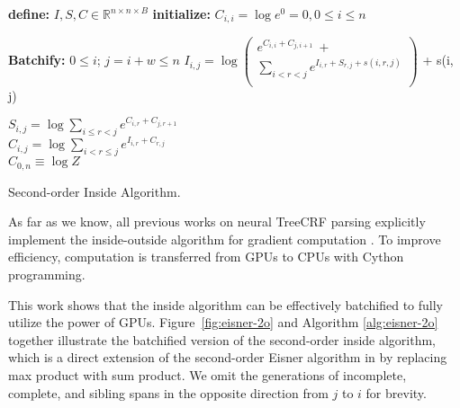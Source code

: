 \documentclass[11pt,a4paper]{article}
\begin{document}
\begin{algorithm}[tb]
\begin{algorithmic}[1]
\newlength{\commentindent}
\setlength{\commentindent}{.2\textwidth}
\renewcommand{\algorithmiccomment}[1]{\unskip\hfill\makebox[\commentindent][l]{$\rhd$~#1}\par}
\LetLtxMacro{\oldalgorithmic}{\algorithmic}
\renewcommand{\algorithmic}[1][0]{\oldalgorithmic[#1]\renewcommand{\ALC@com}[1]{\ifnum\pdfstrcmp{##1}{default}=0\else\algorithmiccomment{##1}\fi}}
\begin{footnotesize}
\STATE \textbf{define:} $I,S,C \in \mathbb{R}^{n \times n \times B}$ 
\STATE \textbf{initialize:} $C_{i, i} = \log e^0 = 0, 0 \le i \le n$


\STATE \textbf{Batchify:} $0 \le i$; $j=i+w \le n$
  \STATE
    $I_{i, j} = \log\left(
      \begin{array}{l}
        e^{C_{i, i}  +  C_{j, i+1}} ~ + \\
      \sum\limits_{i < r < j} e^{I_{i, r} + S_{r, j}
      + s(i, r, j)} \\

      \end{array}
      \right)$ + s(i, j)



  \STATE $S_{i, j} = \log \sum\limits_{i \le r < j} e^{C_{i, r}  +  C_{j, r+1}} $ \\
\STATE $C_{i, j} = \log
    \sum\limits_{i < r \le j} e^{I_{i, r}  +  C_{r, j}}  $ \\
\ENDFOR {}
\RETURN $C_{0, n} \equiv \log Z$
\end{footnotesize}
\end{algorithmic}
\caption{Second-order Inside Algorithm.}
\label{alg:eisner-2o}
\end{algorithm}




%
 
As far as we know, all previous works on neural TreeCRF parsing
explicitly implement the inside-outside algorithm for gradient computation \cite{zhang-etal-2019-empirical, jiang-etal-2018-supervised}.
To improve efficiency, computation is transferred from GPUs to CPUs with Cython programming.

This work shows that the inside algorithm
can be effectively batchified to fully utilize the power of GPUs.
Figure~\ref{fig:eisner-2o} and Algorithm \ref{alg:eisner-2o} together illustrate the batchified version of the second-order inside algorithm, which is a direct extension of the second-order Eisner algorithm in \citet{mcdonald-pereira-2006-online} by replacing max product with sum product.
We omit the generations of incomplete, complete, and sibling spans in the opposite direction from $j$ to $i$ for brevity.
\end{document}
